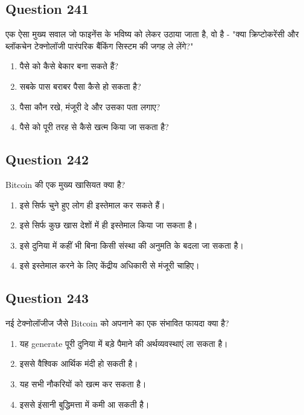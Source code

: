 \documentclass[12pt,a4paper]{article}
\begin{document}
\bigskip


\subsection*{Question 241}
एक ऐसा मुख्य सवाल जो फाइनेंस के भविष्य को लेकर उठाया जाता है, वो है - "क्या क्रिप्टोकरेंसी और ब्लॉकचेन टेक्नोलॉजी पारंपरिक बैंकिंग सिस्टम की जगह ले लेंगे?"

\begin{enumerate}[label=\Alph*., leftmargin=*]
\item पैसे को कैसे बेकार बना सकते हैं?
\item सबके पास बराबर पैसा कैसे हो सकता है?
\item पैसा कौन रखे, मंजूरी दे और उसका पता लगाए?
\item पैसे को पूरी तरह से कैसे खत्म किया जा सकता है?
\end{enumerate}

\bigskip


\subsection*{Question 242}
Bitcoin की एक मुख्य खासियत क्या है?

\begin{enumerate}[label=\Alph*., leftmargin=*]
\item इसे सिर्फ चुने हुए लोग ही इस्तेमाल कर सकते हैं।
\item इसे सिर्फ कुछ खास देशों में ही इस्तेमाल किया जा सकता है।
\item इसे दुनिया में कहीं भी बिना किसी संस्था की अनुमति के बदला जा सकता है।
\item इसे इस्तेमाल करने के लिए केंद्रीय अधिकारी से मंजूरी चाहिए।
\end{enumerate}

\bigskip


\subsection*{Question 243}
नई टेक्नोलॉजीज जैसे Bitcoin को अपनाने का एक संभावित फायदा क्या है?

\begin{enumerate}[label=\Alph*., leftmargin=*]
\item यह generate पूरी दुनिया में बड़े पैमाने की अर्थव्यवस्थाएं ला सकता है।
\item इससे वैश्विक आर्थिक मंदी हो सकती है।
\item यह सभी नौकरियों को खत्म कर सकता है।
\item इससे इंसानी बुद्धिमत्ता में कमी आ सकती है।
\end{enumerate}
\end{document}
